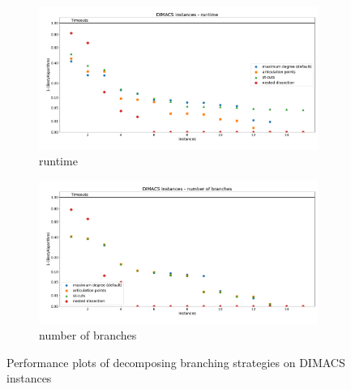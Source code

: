 \documentclass[12pt,a4paper,twoside]{scrartcl}
\numberwithin{equation}{section}
\begin{document}
\begin{figure}[hbt!]
	\begin{subfigure}{1\textwidth}
		\includegraphics[width=\textwidth]{images/plots/a1_dimacs_t}
		\caption{runtime}
	\end{subfigure}
	\begin{subfigure}{1\textwidth}
		\includegraphics[width=\textwidth]{images/plots/a1_dimacs_b}
		\caption{number of branches}
	\end{subfigure}
	\caption{Performance plots of decomposing branching strategies on DIMACS instances}
\end{figure}
\end{document}
